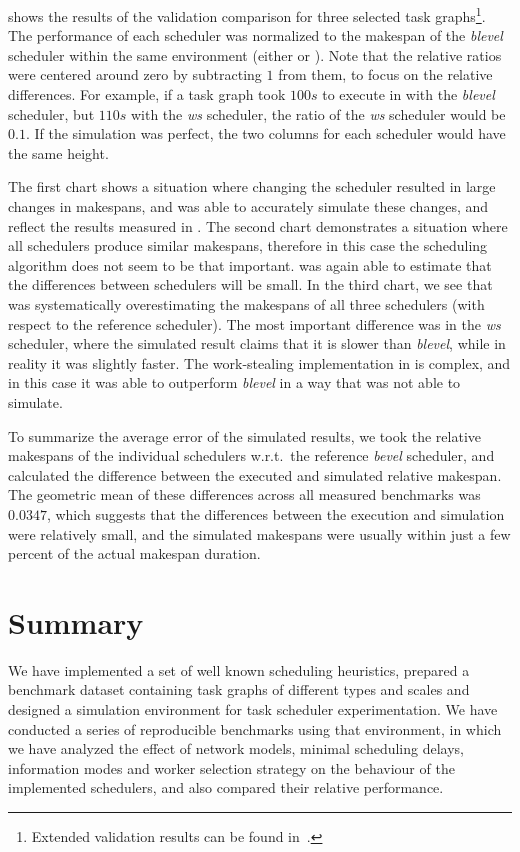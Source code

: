  shows the results of the validation comparison for three selected
task graphs\footnote{Extended validation results can be found in~\cite{estee}.}. The performance of each scheduler was normalized to the
makespan of the \emph{blevel} scheduler within the same environment (either
\estee{} or \dask{}). Note that the relative ratios were centered
around zero by subtracting $1$ from them, to focus on the relative differences.
For example, if a task graph took $100s$ to execute in \dask{} with
the \emph{blevel} scheduler, but $110s$ with the \emph{ws}
scheduler, the ratio of the \emph{ws} scheduler would be $0.1$. If
the simulation was perfect, the two columns for each scheduler would have the same height.

The first chart shows a situation where changing the scheduler resulted in large changes in
makespans, and \estee{} was able to accurately simulate these changes, and reflect
the results measured in \dask{}. The second chart demonstrates a situation where
all schedulers produce similar makespans, therefore in this case the scheduling algorithm does not
seem to be that important. \estee{} was again able to estimate that the differences
between schedulers will be small. In the third chart, we see that \estee{} was
systematically overestimating the makespans of all three schedulers (with respect to the reference
scheduler). The most important difference was in the \emph{ws} scheduler, where the
simulated result claims that it is slower than \emph{blevel}, while in reality it was
slightly faster. The work-stealing implementation in \dask{} is complex, and in
this case it was able to outperform \emph{blevel} in a way that \estee{}
was not able to simulate.

To summarize the average error of the simulated results, we took the relative makespans of the
individual schedulers w.r.t.\ the reference \emph{bevel} scheduler, and calculated the
difference between the executed and simulated relative makespan. The geometric mean of these
differences across all measured benchmarks was $0.0347$, which suggests that the
differences between the execution and simulation were relatively small, and the simulated makespans
were usually within just a few percent of the actual makespan duration.

\section*{Summary}
We have implemented a set of well known scheduling heuristics, prepared a benchmark dataset
containing task graphs of different types and scales and designed a simulation environment for task
scheduler experimentation. We have conducted a series of reproducible benchmarks using that
environment, in which we have analyzed the effect of network models, minimal scheduling delays,
information modes and worker selection strategy on the behaviour of the implemented schedulers, and
also compared their relative performance.

